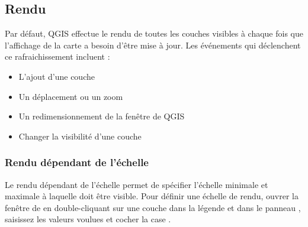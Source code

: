 \subsection{Rendu}\label{subsec:redraw_events}

Par d\'efaut, QGIS effectue le rendu de toutes les couches visibles \`a chaque fois que l'affichage de la carte a besoin d'\^etre mise \`a jour. Les \'ev\'enements qui d\'eclenchent ce rafraichissement incluent :

\begin{itemize}
\item L'ajout d'une couche
\item Un d\'eplacement ou un zoom
\item Un redimensionnement de la fen\^etre de QGIS
\item Changer la visibilit\'e d'une couche
\end{itemize}

%
%
%
%

\subsubsection{Rendu d\'ependant de l'\'echelle}
\label{label_scaledepend}

Le rendu d\'ependant de l'\'echelle permet de sp\'ecifier l'\'echelle minimale et maximale \`a laquelle doit \^etre visible. Pour d\'efinir une \'echelle de rendu, ouvrer la fen\^etre de  en double-cliquant sur une couche dans la l\'egende et dans le panneau , saisissez les valeurs voulues et cocher la case .

